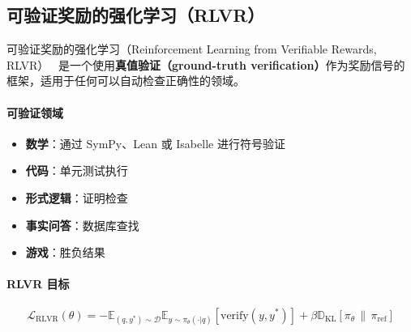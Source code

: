 \subsection{可验证奖励的强化学习（RLVR）}
\label{subsubsec:rlvr}

可验证奖励的强化学习（Reinforcement Learning from Verifiable Rewards, RLVR）~\cite{lambert2024tulu3} 是一个使用\textbf{真值验证（ground-truth verification）}作为奖励信号的框架，适用于任何可以自动检查正确性的领域。

\paragraph{可验证领域}
\label{verifiable-domains}

\begin{itemize}
  \item \textbf{数学}：通过 SymPy、Lean 或 Isabelle 进行符号验证
  \item \textbf{代码}：单元测试执行
  \item \textbf{形式逻辑}：证明检查
  \item \textbf{事实问答}：数据库查找
  \item \textbf{游戏}：胜负结果
\end{itemize}

\paragraph{RLVR 目标}
\label{rlvr-objective}

\begin{equation}
    \mathcal{L}_{\text{RLVR}}(\theta) = -\mathbb{E}_{(q, y^*) \sim \mathcal{D}} \mathbb{E}_{y \sim \pi_\theta(\cdot|q)} \left[ \text{verify}(y, y^*) \right] + \beta \mathbb{D}_{\mathrm{KL}}\!\left[\pi_\theta \,\|\, \pi_{\text{ref}}\right]
\end{equation}

